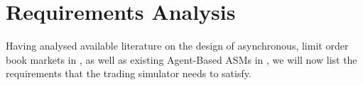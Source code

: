 \section{Requirements Analysis}
Having analysed available literature on the design of asynchronous, limit order book markets in , as well as existing Agent-Based ASMs in , we will now list the requirements that the trading simulator needs to satisfy.